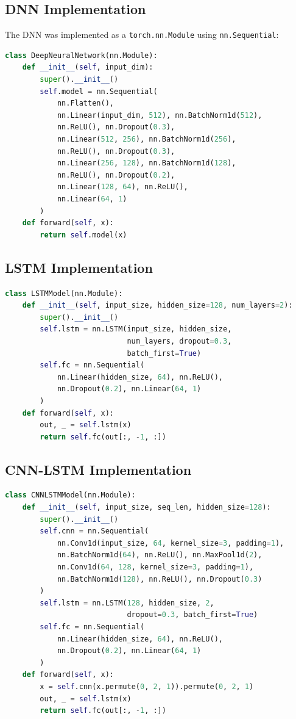 \documentclass[12pt]{article}
\begin{document}
\subsection{DNN Implementation}

The DNN was implemented as a \texttt{torch.nn.Module} using \texttt{nn.Sequential}:

\begin{lstlisting}[language=Python, caption=DNN Architecture]
class DeepNeuralNetwork(nn.Module):
    def __init__(self, input_dim):
        super().__init__()
        self.model = nn.Sequential(
            nn.Flatten(),
            nn.Linear(input_dim, 512), nn.BatchNorm1d(512),
            nn.ReLU(), nn.Dropout(0.3),
            nn.Linear(512, 256), nn.BatchNorm1d(256),
            nn.ReLU(), nn.Dropout(0.3),
            nn.Linear(256, 128), nn.BatchNorm1d(128),
            nn.ReLU(), nn.Dropout(0.2),
            nn.Linear(128, 64), nn.ReLU(),
            nn.Linear(64, 1)
        )
    def forward(self, x):
        return self.model(x)
\end{lstlisting}

\subsection{LSTM Implementation}

\begin{lstlisting}[language=Python, caption=LSTM Architecture]
class LSTMModel(nn.Module):
    def __init__(self, input_size, hidden_size=128, num_layers=2):
        super().__init__()
        self.lstm = nn.LSTM(input_size, hidden_size,
                            num_layers, dropout=0.3,
                            batch_first=True)
        self.fc = nn.Sequential(
            nn.Linear(hidden_size, 64), nn.ReLU(),
            nn.Dropout(0.2), nn.Linear(64, 1)
        )
    def forward(self, x):
        out, _ = self.lstm(x)
        return self.fc(out[:, -1, :])
\end{lstlisting}

\subsection{CNN-LSTM Implementation}

\begin{lstlisting}[language=Python, caption=CNN-LSTM Architecture]
class CNNLSTMModel(nn.Module):
    def __init__(self, input_size, seq_len, hidden_size=128):
        super().__init__()
        self.cnn = nn.Sequential(
            nn.Conv1d(input_size, 64, kernel_size=3, padding=1),
            nn.BatchNorm1d(64), nn.ReLU(), nn.MaxPool1d(2),
            nn.Conv1d(64, 128, kernel_size=3, padding=1),
            nn.BatchNorm1d(128), nn.ReLU(), nn.Dropout(0.3)
        )
        self.lstm = nn.LSTM(128, hidden_size, 2,
                            dropout=0.3, batch_first=True)
        self.fc = nn.Sequential(
            nn.Linear(hidden_size, 64), nn.ReLU(),
            nn.Dropout(0.2), nn.Linear(64, 1)
        )
    def forward(self, x):
        x = self.cnn(x.permute(0, 2, 1)).permute(0, 2, 1)
        out, _ = self.lstm(x)
        return self.fc(out[:, -1, :])
\end{lstlisting}
\end{document}

